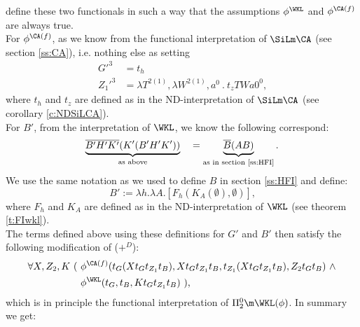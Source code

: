 define these two functionals in such a way that the 
assumptions $\phi^{\WKL}$ and $\phi^{\CA(f)}$ are always true.\\
For $\phi^{\CA(f)}$, as we know from the functional interpretation of $\SiLm\CA$ 
(see section \ref{ss:CA}), 
i.e. nothing else as setting 
\begin{align*}
      G'^{\mathit{3}}&=t_h \\
      Z_1'^{\mathit{3}}&=\lambda T^{2(1)},\lambda W^{2(1)},a^0\ .\ t_zTWa0^0
\text{,} 
\end{align*}
where $t_h$ and $t_z$ are defined as in the ND-interpretation of $\SiLm\CA$ 
(see corollary \ref{c:NDSiLCA}).\\
For $B'$, from the interpretation of $\WKL$, we know the following
correspond:
\[ 
\underbrace{\overline {B'H'K'}(K'(B'H'K'))}_{\text{as above}}\quad = 
\underbrace{\overline{B}(AB)}_{\text{as in section \ref{ss:HFI}}} 
\text{.} 
\]
We use the same notation as we used to define $B$ in section \ref{ss:HFI} and define:
\[
        B':=\lambda h.\lambda A.[F_h(K_{A}(\emptyset),\emptyset)] \text{,}
\]
where $F_h$ and $K_A$ are defined as in the ND-interpretation of $\WKL$ 
(see theorem \ref{t:FIwkl}).\\
The terms defined above using these definitions for $G'$ and $B'$ then satisfy the following
modification of ($+^D$):
\begin{align*}
\forall X,Z_2,K\ (\ &\phi^{\CA(f)}(
 t_{G}(Xt_{G}t_{Z_1}t_{B}),
 Xt_{G}t_{Z_1}t_{B},
 t_{Z_1}( Xt_{G}t_{Z_1}t_{B} ),
 Z_2t_Gt_{B})\ \wedge\\
 &\phi^{\WKL}(t_{G},t_{B},Kt_{G}t_{Z_1}t_{B})\ ) \text{,}
\end{align*}
which is in principle the functional interpretation of $\Pi^0_2\m\WKL(\phi)$. In summary we get:
%
%
